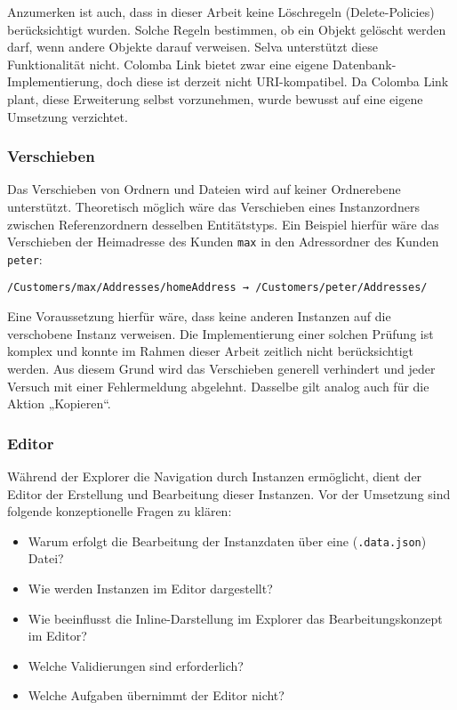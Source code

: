 Anzumerken ist auch, dass in dieser Arbeit keine Löschregeln (Delete-Policies) berücksichtigt wurden. Solche Regeln bestimmen, ob ein Objekt gelöscht werden darf, wenn andere Objekte darauf verweisen. Selva unterstützt diese Funktionalität nicht. Colomba Link bietet zwar eine eigene Datenbank-Implementierung, doch diese ist derzeit nicht URI-kompatibel. Da Colomba Link plant, diese Erweiterung selbst vorzunehmen, wurde bewusst auf eine eigene Umsetzung verzichtet.

\subsubsection*{Verschieben}
Das Verschieben von Ordnern und Dateien wird auf keiner Ordnerebene unterstützt. Theoretisch möglich wäre das Verschieben eines Instanzordners zwischen Referenzordnern desselben Entitätstyps. Ein Beispiel hierfür wäre das Verschieben der Heimadresse des Kunden \texttt{max} in den Adressordner des Kunden \texttt{peter}:

\begin{verbatim}
/Customers/max/Addresses/homeAddress → /Customers/peter/Addresses/
\end{verbatim}

Eine Voraussetzung hierfür wäre, dass keine anderen Instanzen auf die verschobene Instanz verweisen. Die Implementierung einer solchen Prüfung ist komplex und konnte im Rahmen dieser Arbeit zeitlich nicht berücksichtigt werden. Aus diesem Grund wird das Verschieben generell verhindert und jeder Versuch mit einer Fehlermeldung abgelehnt. Dasselbe gilt analog auch für die Aktion „Kopieren“.


\subsubsection{Editor}
\label{sec:Editor}
Während der Explorer die Navigation durch Instanzen ermöglicht, dient der Editor der Erstellung und Bearbeitung dieser Instanzen. Vor der Umsetzung sind folgende konzeptionelle Fragen zu klären:

\begin{itemize}
\item Warum erfolgt die Bearbeitung der Instanzdaten über eine (\texttt{.data.json}) Datei?
\item Wie werden Instanzen im Editor dargestellt?
\item Wie beeinflusst die Inline-Darstellung im Explorer das Bearbeitungskonzept im Editor?
\item Welche Validierungen sind erforderlich?
\item Welche Aufgaben übernimmt der Editor nicht?
\end{itemize}

